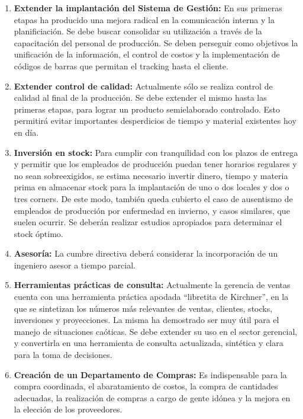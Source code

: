 \documentclass[a4paper,10pt,titlepage]{article}
\begin{document}
\begin{enumerate}
\item \textbf{Extender la implantaci\'on del Sistema de Gesti\'on:} En sus primeras etapas ha producido una mejora radical en la comunicaci\'on interna y la planificiaci\'on. Se debe buscar consolidar su utilizaci\'on a trav\'es de la capacitaci\'on del personal de producci\'on. Se deben perseguir como objetivos la unificaci\'on de la informaci\'on, el control de costos y la implementaci\'on de c\'odigos de barras que permitan el tracking hasta el cliente.

\item \textbf{Extender control de calidad:} Actualmente s\'olo se realiza control de calidad al final de la producci\'on. Se debe extender el mismo hasta las primeras etapas, para lograr un producto semielaborado controlado. Esto permitir\'a evitar importantes desperdicios de tiempo y material existentes hoy en d\'ia.

\item \textbf{Inversi\'on en stock:} Para cumplir con tranquilidad con los plazos de entrega y permitir que los empleados de producci\'on puedan tener horarios regulares y no sean sobreexigidos, se estima necesario invertir dinero, tiempo y materia prima en almacenar stock para la implantaci\'on de uno o dos locales y dos o tres corners. De este modo, tambi\'en queda cubierto el caso de ausentismo de empleados de producci\'on por enfermedad en invierno, y casos similares, que suelen ocurrir. Se deber\'an realizar estudios apropiados para determinar el stock \'optimo.

\item \textbf{Asesor\'ia:} La cumbre directiva deber\'a considerar la incorporaci\'on de un ingeniero asesor a tiempo parcial.

\item \textbf{Herramientas pr\'acticas de consulta:} Actualmente la gerencia de ventas cuenta con una herramienta pr\'actica apodada ``libretita de Kirchner'', en la que se sintetizan los n\'umeros m\'as relevantes de ventas, clientes, stocks, inversiones y proyecciones. La misma ha demostrado ser muy \'util para el manejo de situaciones ca\'oticas. Se debe extender su uso en el sector gerencial, y convertirla en una herramienta de consulta actualizada, sint\'etica y clara para la toma de decisiones.

\item \textbf{Creaci\'on de un Departamento de Compras:} Es indispensable para la compra coordinada, el abaratamiento de costos, la compra de cantidades adecuadas, la realizaci\'on de compras a cargo de gente id\'onea y la mejora en la elecci\'on de los proveedores.


\end{enumerate}
\end{document}
